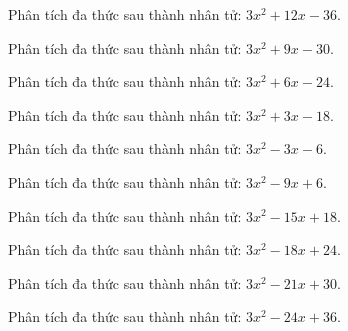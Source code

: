 \begin{bt}
	Phân tích đa thức sau thành nhân tử: $3 x^2 + 12 x - 36$.
\end{bt}
\begin{bt}
	Phân tích đa thức sau thành nhân tử: $3 x^2 + 9 x - 30$.
\end{bt}
\begin{bt}
	Phân tích đa thức sau thành nhân tử: $3 x^2 + 6 x - 24$.
\end{bt}
\begin{bt}
	Phân tích đa thức sau thành nhân tử: $3 x^2 + 3 x - 18$.
\end{bt}
\begin{bt}
	Phân tích đa thức sau thành nhân tử: $3 x^2 - 3 x - 6$.
\end{bt}
\begin{bt}
	Phân tích đa thức sau thành nhân tử: $3 x^2 - 9 x + 6$.
\end{bt}
\begin{bt}
	Phân tích đa thức sau thành nhân tử: $3 x^2 - 15 x + 18$.
\end{bt}
\begin{bt}
	Phân tích đa thức sau thành nhân tử: $3 x^2 - 18 x + 24$.
\end{bt}
\begin{bt}
	Phân tích đa thức sau thành nhân tử: $3 x^2 - 21 x + 30$.
\end{bt}
\begin{bt}
	Phân tích đa thức sau thành nhân tử: $3 x^2 - 24 x + 36$.
\end{bt}
